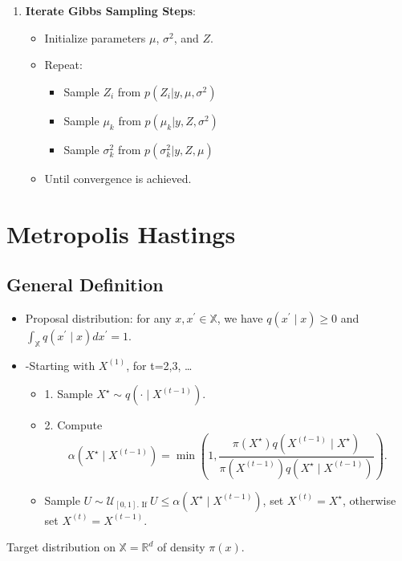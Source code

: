 \documentclass{article}
\begin{document}
\begin{enumerate}
    \item \textbf{Iterate Gibbs Sampling Steps}:
    \begin{itemize}
        \item Initialize parameters \(\mu\), \(\sigma^2\), and \(Z\).
        \item Repeat:
        \begin{itemize}
            \item Sample \(Z_i\) from \(p(Z_i | y, \mu, \sigma^2)\)
            \item Sample \(\mu_k\) from \(p(\mu_k | y, Z, \sigma^2)\)
            \item Sample \(\sigma_k^2\) from \(p(\sigma_k^2 | y, Z, \mu)\)
        \end{itemize}
        \item Until convergence is achieved.
    \end{itemize}
\end{enumerate}


\section{Metropolis Hastings}
\subsection{General Definition}
\begin{itemize}
    \item Proposal distribution: for any $x, x^{\prime} \in \mathbb{X}$, we have $q\left(x^{\prime} \mid x\right) \geq 0$ and $\int_{\mathbb{X}} q\left(x^{\prime} \mid x\right) d x^{\prime}=1$.
    \item -Starting with $X^{(1)}$, for t=2,3, \ldots
\begin{itemize}
    \item 1. Sample $X^{\star} \sim q\left(\cdot \mid X^{(t-1)}\right)$.
    \item 2. Compute 
$$
\alpha\left(X^{\star} \mid X^{(t-1)}\right)=\min \left(1, \frac{\pi\left(X^{\star}\right) q\left(X^{(t-1)} \mid X^{\star}\right)}{\pi\left(X^{(t-1)}\right) q\left(X^{\star} \mid X^{(t-1)}\right)}\right) .
$$
\item Sample $U \sim \mathcal{U}_{[0,1] \text {. If }} U \leq \alpha\left(X^{\star} \mid X^{(t-1)}\right)$, set $X^{(t)}=X^{\star}$, otherwise set $X^{(t)}=X^{(t-1)}$.
\end{itemize}
\end{itemize}Target distribution on $\mathbb{X}=\mathbb{R}^d$ of density $\pi(x)$.
\end{document}
